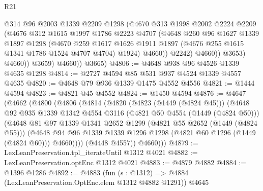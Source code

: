 \begin{lexlean}{R21}
\begin{coremodule}
                      @314
                      @96
                      @2003
                      @1339
                      @2209
                      @1298
                      (@4670
                        @313
                        @1998
                        @2002
                        @2224
                        @2209
                        (@4676
                          @312
                          @1615
                          @1997
                          @1786
                          @2223
                          @4707
                          (@4648
                            @260
                            @96
                            @1627
                            @1339
                            @1897
                            @1298
                            (@4670
                              @259
                              @1617
                              @1626
                              @1911
                              @1897
                              (@4676 @255 @1615 @1341 @1786 @1524 @4707 @4704)
                              @1924)
                            @4660))
                        @2242)
                      @4660))
                  @3653)
                @4660))
            @3659)
          @4660))
      @3665)
@4806 := @4648 @938 @96 @4526 @1339 @4635 @1298
@4814 := @2727 @4594 @85 @531 @937 @4524 @1339 @4557 @4635
@4820 := @4648 @79 @936 @1339 @1475 @4552 @4556
@4821 := @1444 @4594
@4823 := @4821 @45 @4552
@4824 := @1450 @4594
@4876 := @4647
    (@4662
      (@4800
        (@4806
          (@4814
            (@4820
              (@4823 (@1449 (@4824 @45)))
              (@4648
                @92
                @935
                @1339
                @1342
                @4554
                @3116
                (@4821 @50 @4554 (@1449 (@4824 @50)))
                (@4648
                  @81
                  @97
                  @1339
                  @1341
                  @2652
                  @1299
                  (@4821 @55 @2652 (@1449 (@4824 @55)))
                  (@4648
                    @94
                    @96
                    @1339
                    @1339
                    @1296
                    @1298
                    (@4821 @60 @1296 (@1449 (@4824 @60)))
                    @4660))))
            (@4448 @4557))
          @4660)))
@4879 := LexLeanPreservation.tpl_iterateUntil @1312 @4021
@4882 := LexLeanPreservation.optEnc @1312 @4021
@4883 := @4879 @4882
@4884 := @1396 @1286
@4892 := @4883 (fun (s : @1312) => @4884 (LexLeanPreservation.OptEnc.elem @1312 @4882 @1291)) @4645

\end{coremodule}
\end{lexlean}
